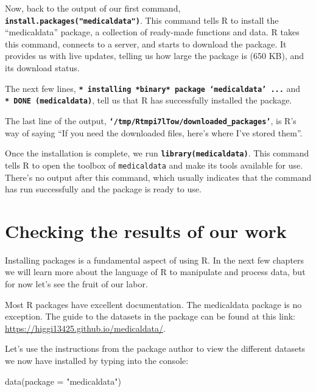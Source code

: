 \documentclass[
  letterpaper,
  DIV=11,
  numbers=noendperiod]{scrreprt}
\newenvironment{Shaded}{\begin{snugshade}}{\end{snugshade}}
\newcommand{\AttributeTok}[1]{\textcolor[rgb]{0.40,0.45,0.13}{#1}}
\newcommand{\FunctionTok}[1]{\textcolor[rgb]{0.28,0.35,0.67}{#1}}
\newcommand{\NormalTok}[1]{\textcolor[rgb]{0.00,0.23,0.31}{#1}}
\newcommand{\StringTok}[1]{\textcolor[rgb]{0.13,0.47,0.30}{#1}}
\begin{document}
Now, back to the output of our first command,
\textbf{\texttt{install.packages("medicaldata")}}. This command tells R
to install the ``medicaldata'' package, a collection of ready-made
functions and data. R takes this command, connects to a server, and
starts to download the package. It provides us with live updates,
telling us how large the package is (650 KB), and its download status.

The next few lines,
\textbf{\texttt{*\ installing\ *binary*\ package\ ‘medicaldata’\ ...}}
and \textbf{\texttt{*\ DONE\ (medicaldata)}}, tell us that R has
successfully installed the package.

The last line of the output,
\textbf{\texttt{‘/tmp/Rtmpi7lTow/downloaded\_packages’}}, is R's way of
saying ``If you need the downloaded files, here's where I've stored
them''.

Once the installation is complete, we run
\textbf{\texttt{library(medicaldata)}}. This command tells R to open the
toolbox of \texttt{medicaldata} and make its tools available for use.
There's no output after this command, which usually indicates that the
command has run successfully and the package is ready to use.

\hypertarget{checking-the-results-of-our-work}{%
\section{Checking the results of our
work}\label{checking-the-results-of-our-work}}

Installing packages is a fundamental aspect of using R. In the next few
chapters we will learn more about the language of R to manipulate and
process data, but for now let's see the fruit of our labor.

Most R packages have excellent documentation. The medicaldata package is
no exception. The guide to the datasets in the package can be found at
this link: \url{https://higgi13425.github.io/medicaldata/}.

Let's use the instructions from the package author to view the different
datasets we now have installed by typing into the console:

\begin{Shaded}
\begin{Highlighting}[]
\FunctionTok{data}\NormalTok{(}\AttributeTok{package =} \StringTok{"medicaldata"}\NormalTok{)}
\end{Highlighting}
\end{Shaded}
\end{document}
